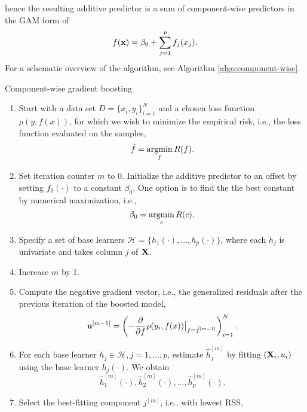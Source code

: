 hence the resulting additive predictor is a sum of component-wise predictors in the GAM form of
\begin{equation}
    f(\mathbf{x})=\beta_0+\sum_{j=1}^p f_j(x_j).
\end{equation}
For a schematic overview of the algorithm, see Algorithm \ref{algo:component-wise}.
\begin{algorithm}
\caption{Component-wise gradient boosting}\label{algo:component-wise}
\begin{enumerate}
    \item Start with a data set $D=\{x_i, y_i\}_{i=1}^N$ and a chosen loss function $\rho(y,f(x))$, for which we wish to
        minimize the empirical risk, i.e., the loss function evaluated on the samples,
        \begin{equation}
            \hat{f}=\operatorname*{argmin}_{f}R(f).
        \end{equation}
    \item Set iteration counter $m$ to 0. Initialize the additive predictor to an offset by setting $f_0(\cdot)$ to a constant $\beta_0$. One option is to find the the best constant by numerical maximization, i.e.,
        \begin{equation}
            \beta_0=\operatorname*{argmin}_c R(c).
        \end{equation}
    \item Specify a set of base learners $\mathcal{H}=\{h_1(\cdot),\dotsc,h_p(\cdot)\}$, where each $h_j$ is univariate and takes column $j$ of $\mathbf{X}$.
    \item\label{first-step} Increase $m$ by 1.
    \item Compute the negative gradient vector, i.e., the generalized residuals after the previous iteration of the boosted model,
        \begin{equation}
            \mathbf{u}^{[m-1]}=\left(-\frac{\partial}{\partial f}\rho(y_i, f(x))\big\rvert_{f=\hat{f}^{[m-1]}}\right)_{i=1}^N.
        \end{equation}
    \item For each base learner $h_j\in\mathcal{H},j=1,\ldots,p$, estimate $\hat{h}_{j}^{[m]}$ by fitting $(\mathbf{X}_i,u_i)$ using the base learner $h_j(\cdot)$. We obtain
        \begin{equation}
            \hat{h}_1^{[m]}(\cdot),\hat{h}_2^{[m]}(\cdot),\ldots,\hat{h}_p^{[m]}(\cdot).
        \end{equation}
    \item Select the best-fitting component $j^{[m]}$, i.e., with lowest RSS,
        \begin{equation}

\end{equation}
\end{enumerate}
\end{algorithm}
